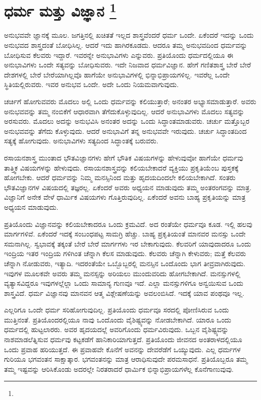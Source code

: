 
\chapter[ಧರ್ಮ ಮತ್ತು ವಿಜ್ಞಾನ ]{ಧರ್ಮ ಮತ್ತು ವಿಜ್ಞಾನ \protect\footnote{}}

ಅನುಭವವೇ ಜ್ಞಾನಕ್ಕೆ ಮೂಲ. ಜಗತ್ತಿನಲ್ಲಿ ಖಚಿತತೆ ಇಲ್ಲದ ಶಾಸ್ತ್ರವೆಂದರೆ ಧರ್ಮ ಒಂದೇ. ಏಕೆಂದರೆ ಇದನ್ನು ಒಂದು ಅನುಭವದ ಶಾಸ್ತ್ರದಂತೆ ಬೋಧಿಸಿಲ್ಲ. ಆದರೆ ಇದು ಹಾಗಿರಕೂಡದು. ಆದರೂ ತಮ್ಮ ಅನುಭವದಿಂದ ಧರ್ಮವನ್ನು ಬೋಧಿಸುವ ಕೆಲವರು ಇದ್ದಾರೆ. ಇವರನ್ನೇ ಅನುಭಾವಿಗಳು ಎನ್ನುವರು. ಪ್ರತಿಯೊಂದು ಧರ್ಮದಲ್ಲಿಯೂ ಈ ಅನುಭಾವಿಗಳು ಒಂದೇ ಸತ್ಯವನ್ನು ಬೋಧಿಸುವರು. ಇದೇ ನಿಜವಾದ ಧರ್ಮವಿಜ್ಞಾನ. ಹೇಗೆ ಗಣಿತಶಾಸ್ತ್ರ ಬೇರೆ ಬೇರೆ ದೇಶಗಳಲ್ಲಿ ಬೇರೆ ಬೇರೆಯಾಗಿಲ್ಲವೊ ಹಾಗೆಯೇ ಅನುಭಾವಿಗಳಲ್ಲಿ ಭಿನ್ನಾಭಿಪ್ರಾಯಗಳಿಲ್ಲ. ಇವರೆಲ್ಲ ಒಂದೇ ಸ್ಥಿತಿಯಲ್ಲಿರುವರು. ಇವರ ಅನುಭವ ಒಂದೇ. ಅದೇ ಒಂದು ನಿಯಮವಾಗುವುದು.

ಚರ್ಚಿಗೆ ಹೋಗುವವರು ಮೊದಲು ಅಲ್ಲಿ ಒಂದು ಧರ್ಮವನ್ನು ಕಲಿಯುತ್ತಾರೆ; ಅನಂತರ ಅಭ್ಯಾಸಮಾಡುತ್ತಾರೆ. ಅವರು ಅನುಭವವನ್ನು ತಮ್ಮ ನಂಬಿಕೆಗೆ ಆಧಾರವಾಗಿ ತೆಗೆದುಕೊಳ್ಳುವುದಿಲ್ಲ. ಆದರೆ ಅನುಭಾವಿಗಳು ಮೊದಲು ಸತ್ಯವನ್ನು ಅರಸುವರು. ಮೊದಲು ಅದನ್ನು ಅನುಭವಿಸಿ ಅನಂತರ ಅದನ್ನು ಒಂದು ಸಿದ್ಧಾಂತಮಾಡುವರು. ಚರ್ಚು ಮತ್ತೊಬ್ಬರ ಅನುಭವವನ್ನು ತೆಗೆದು ಕೊಳ್ಳುವುದು. ಆದರೆ ಅನುಭಾವಿಗೆ ತನ್ನ ಅನುಭವವೇ ಇರುವುದು. ಚರ್ಚು ಸಿದ್ಧಾಂತದಿಂದ ಸತ್ಯಕ್ಕೆ ಹೋಗುವುದು. ಅನುಭಾವಿಗಳು ಸತ್ಯದಿಂದ ಸಿದ್ಧಾಂತಕ್ಕೆ ಬರುವರು.

ರಸಾಯನಶಾಸ್ತ್ರ ಮುಂತಾದ ಭೌತವಿಜ್ಞಾನಗಳು ಹೇಗೆ ಭೌತಿಕ ವಿಷಯಗಳನ್ನು ಹೇಳುವುವೋ ಹಾಗೆಯೇ ಧರ್ಮವು ತಾತ್ತ್ವಿಕ ವಿಷಯಗಳನ್ನು ಹೇಳುವುದು. ರಸಾಯನಶಾಸ್ತ್ರವನ್ನು ಕಲಿಯಬೇಕಾದರೆ ವ್ಯಕ್ತಿಯು ಪ್ರಕೃತಿಯೆಂಬ ಪುಸ್ತಕಕ್ಕೆ ಹೋಗಬೇಕು. ಆದರೆ ಧರ್ಮವನ್ನು ನಿಮ್ಮ ಮನಸ್ಸಿನಿಂದ ಮತ್ತು ಹೃದಯದಿಂದಲೇ ಕಲಿಯಬೇಕಾಗಿದೆ. ಸಂತರು ಭೌತವಿಜ್ಞಾನಗಳ ವಿಷಯದಲ್ಲಿ ತಜ್ಞರಲ್ಲ. ಏಕೆಂದರೆ ಅವರು ಅಧ್ಯಯನ ಮಾಡುವುದು ತಮ್ಮ ಅಂತರಂಗವನ್ನು ಮಾತ್ರ. ವಿಜ್ಞಾನಿಗೆ ಅನೇಕ ವೇಳೆ ಧಾರ್ಮಿಕ ವಿಷಯಗಳು ಗೊತ್ತಿರುವುದಿಲ್ಲ. ಏಕೆಂದರೆ ಅವನು ಬಾಹ್ಯ ಪ್ರಕೃತಿಯನ್ನು ಮಾತ್ರ ಅಧ್ಯಯನ ಮಾಡುವುದು.

ಪ್ರತಿಯೊಂದು ವಿಜ್ಞಾನವನ್ನು ಕಲಿಯಬೇಕಾದರೂ ಒಂದು ಕ್ರಮವಿದೆ. ಅದ ರಂತೆಯೇ ಧರ್ಮವೂ ಕೂಡ. ಇಲ್ಲಿ ಹಲವು ಮಾರ್ಗಗಳಿವೆ. ಏಕೆಂದರೆ ಇದಕ್ಕೆ ಸಂಬಂಧಪಟ್ಟ ಸಾಮಗ್ರಿ ಹೆಚ್ಚು. ಬಾಹ್ಯ ಪ್ರಕೃತಿಯಂತೆ ಮಾನವರ ಮನಸ್ಸು ಒಂದೇ ಸಮನಾಗಿಲ್ಲ. ಸ್ವಭಾವಕ್ಕೆ ತಕ್ಕಂತೆ ಬೇರೆ ಬೇರೆ ಮಾರ್ಗಗಳು ಇರ ಬೇಕಾಗುವುದು. ಕೆಲವರಿಗೆ ಯಾವುದಾದರೂ ಒಂದು ಇಂದ್ರಿಯ ಇತರ ಇಂದ್ರಿಯ ಗಳಿಗಿಂತ ಚೆನ್ನಾಗಿ ಕೆಲಸ ಮಾಡುವುದು. ಕೆಲವರು ಚೆನ್ನಾಗಿ ಕೇಳುವರು; ಮತ್ತೆ ಕೆಲವರು ಚೆನ್ನಾಗಿ ನೋಡುವರು, ಇತ್ಯಾದಿ. ಇದರಂತೆಯೇ ಒಬ್ಬೊಬ್ಬರಲ್ಲಿ ಮನಸ್ಸಿನ ಒಂದೊಂದು ಭಾಗ ತೀವ್ರವಾಗಿರುವುದು. ಇವುಗಳ ಮೂಲಕವೇ ಅವರು ತಮ್ಮ ಮನಸ್ಸನ್ನು ಅರಿಯಲು ಮುಂದುವರಿದು ಹೋಗಬೇಕಾಗಿದೆ. ಮನಸ್ಸುಗಳಲ್ಲಿ ವ್ಯತ್ಯಾಸವಿದ್ದರೂ ಇವುಗಳಲ್ಲೆಲ್ಲಾ ಒಂದು ಸಾಮಾನ್ಯ ಗುಣವೂ ಇದೆ. ಎಲ್ಲಾ ಮನಸ್ಸುಗಳಿಗೂ ಅನ್ವಯಿಸುವ ಒಂದು ಶಾಸ್ತ್ರವಿದೆ. ಧರ್ಮ ವಿಜ್ಞಾನವು ಮಾನವನ ಆತ್ಮ ವಿಶ್ಲೇಷಣೆಯನ್ನು ಅವಲಂಬಿಸಿದೆ. ಇದಕ್ಕೆ ಯಾವ ಪಂಥವೂ ಇಲ್ಲ.

ಎಲ್ಲರಿಗೂ ಒಂದೇ ಧರ್ಮ ಸರಿಹೋಗುವುದಿಲ್ಲ. ಪ್ರತಿಯೊಂದು ಧರ್ಮವೂ ಸರದಲ್ಲಿ ಪೋಣಿಸಿರುವ ಒಂದು ಮುತ್ತಿನಂತೆ. ಪ್ರತಿಯೊಂದರಲ್ಲಿಯೂ ನಾವು ಒಂದೊಂದು ವೈಶಿಷ್ಟ್ಯವನ್ನು ನೋಡಬೇಕಾಗಿದೆ. ಯಾರೂ ಒಂದು ಧರ್ಮದಲ್ಲಿ ಹುಟ್ಟಲಾರರು. ಅವರ ಹೃದಯದಲ್ಲೆ ಅವರಿಗೊಂದು ಧರ್ಮವಿರುವುದು. ಒಬ್ಬನ ವೈಶಿಷ್ಟ್ಯವನ್ನು ನಾಶಮಾಡಲೆತ್ನಿಸುವ ಧರ್ಮವು ಕಟ್ಟಕಡೆಗೆ ಹಾನಿಕಾರಿಯಾಗುತ್ತದೆ. ಪ್ರತಿಯೊಂದು ಜೀವನದ ಅಂತರಾಳದಲ್ಲಿಯೂ ಒಂದು ಪ್ರವಾಹ ಹರಿಯುತ್ತದೆ. ಈ ಪ್ರವಾಹವೇ ಕೊನೆಗೆ ಅವನನ್ನು ದೇವರೆಡೆಗೆ ಒಯ್ಯುವುದು. ಎಲ್ಲ ಧರ್ಮಗಳ ಗುರಿಯೂ ಭಗವಂತನ ಸಾಕ್ಷಾತ್ಕಾರ. ಭಗವಂತನನ್ನು ಮಾತ್ರ ಆರಾಧಿಸುವುದೇ ಪರಮಸಾಧನೆ. ಪ್ರತಿಯೊಬ್ಬರೂ ತಮ್ಮ ತಮ್ಮ ಇಷ್ಟವನ್ನು ಆರಿಸಿಕೊಂಡು ಅದರಲ್ಲೇ ನಿರತರಾದರೆ ಧಾರ್ಮಿಕ ಭಿನ್ನಾಭಿಪ್ರಾಯಗಳೆಲ್ಲ ಕೊನೆಗಾಣುವುವು.

